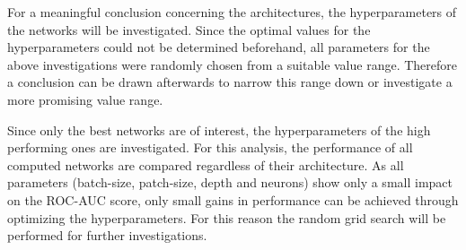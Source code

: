 For a meaningful conclusion concerning the architectures, the hyperparameters of the networks will be investigated.
Since the optimal values for the hyperparameters could not be determined beforehand,
all parameters for the above investigations were randomly chosen from a suitable value range.
Therefore a conclusion can be drawn afterwards to narrow this range down or investigate a more promising value range.

Since only the best networks are of interest, the hyperparameters of the high performing ones are investigated.
For this analysis, the performance of all computed networks are compared regardless of their architecture.
As all parameters (batch-size, patch-size, depth and neurons) show only a small impact on the ROC-AUC score,
only small gains in performance can be achieved through optimizing the hyperparameters.
For this reason the random grid search will be performed for further investigations.

